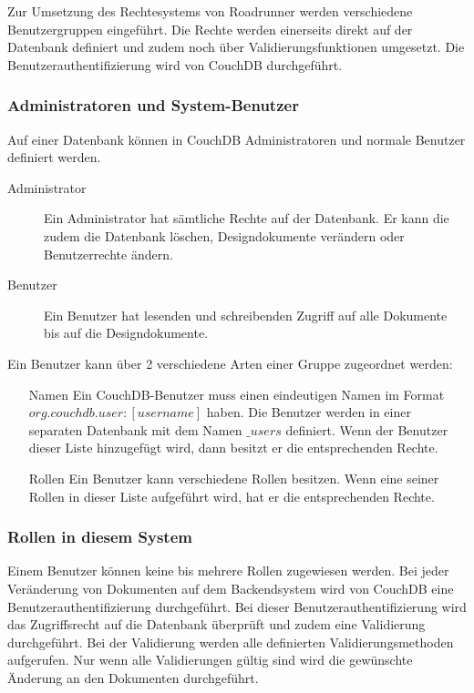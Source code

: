 Zur Umsetzung des Rechtesystems von Roadrunner werden verschiedene Benutzergruppen
	eingeführt. Die Rechte werden einerseits direkt auf der Datenbank definiert und
	zudem noch über Validierungsfunktionen umgesetzt. Die Benutzerauthentifizierung
	wird von CouchDB durchgeführt.

\subsubsection{Administratoren und System-Benutzer}

Auf einer Datenbank können in CouchDB Administratoren und normale Benutzer definiert
	werden.
	
\begin{description}
	\item[Administrator] Ein Administrator hat sämtliche Rechte auf der Datenbank.
		Er kann die zudem die Datenbank löschen, Designdokumente verändern oder
		Benutzerrechte ändern.
	\item[Benutzer] Ein Benutzer hat lesenden und schreibenden Zugriff auf
		alle Dokumente bis auf die Designdokumente.
\end{description}

\noindent Ein Benutzer kann über 2 verschiedene Arten einer Gruppe zugeordnet werden:

\begin{itemize}
	\item[Namen] Ein CouchDB-Benutzer muss einen eindeutigen Namen im Format
		$org.couchdb.user:[username]$ haben. Die Benutzer werden in einer separaten
		Datenbank mit dem Namen $\_users$ definiert. Wenn der Benutzer dieser Liste
		hinzugefügt wird, dann besitzt er die entsprechenden Rechte.
		
	\item[Rollen] Ein Benutzer kann verschiedene Rollen besitzen. Wenn eine seiner
		Rollen in dieser Liste aufgeführt wird, hat er die entsprechenden Rechte. 
\end{itemize}

\subsubsection{Rollen in diesem System}

Einem Benutzer können keine bis mehrere Rollen zugewiesen werden. Bei jeder Veränderung
	von Dokumenten auf dem Backendsystem wird von CouchDB eine Benutzerauthentifizierung
	durchgeführt. Bei dieser Benutzerauthentifizierung wird das Zugriffsrecht auf die
	Datenbank überprüft und zudem eine Validierung durchgeführt. Bei der Validierung
	werden alle definierten Validierungsmethoden aufgerufen. Nur wenn alle Validierungen
	gültig sind wird die gewünschte Änderung an den Dokumenten durchgeführt.
	
